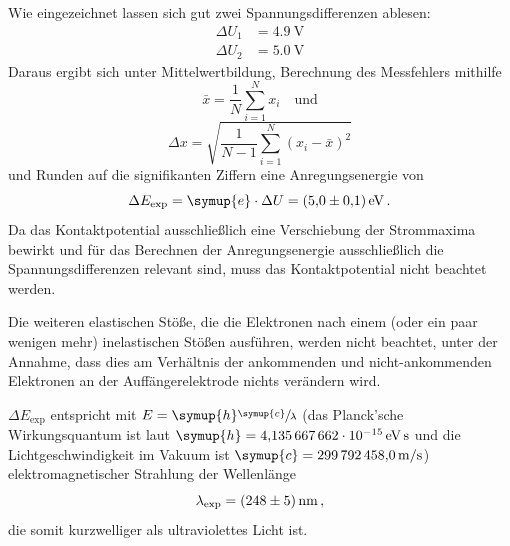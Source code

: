Wie eingezeichnet lassen sich gut zwei Spannungsdifferenzen ablesen:
\begin{align*}
    \Delta U_1&=\SI{4.9}{\volt} \\
    \Delta U_2&=\SI{5.0}{\volt}
\end{align*}
Daraus ergibt sich unter Mittelwertbildung, Berechnung des Messfehlers mithilfe 
\begin{equation*}
    \bar{x}=\frac{1}{N}\sum_{i=1}^N x_i \quad \text{und}
\end{equation*}
\begin{equation*}
    \Delta x = \sqrt{\frac{1}{N-1} \sum_{i=1}^N (x_i-\bar{x})^2}
\end{equation*}
und Runden auf die signifikanten Ziffern eine Anregungsenergie von 
\begin{equation}
    \Delta E_\text{exp}=\symup{e}\cdot \Delta U = \SI{5.0+-0.1}{\electronvolt}\,.
\end{equation}
Da das Kontaktpotential ausschließlich eine Verschiebung der Strommaxima bewirkt und für das Berechnen der 
Anregungsenergie ausschließlich die Spannungsdifferenzen relevant sind, muss das Kontaktpotential nicht beachtet werden. 

Die weiteren elastischen Stöße, die die Elektronen nach einem (oder ein paar wenigen mehr) inelastischen Stößen ausführen, 
werden nicht beachtet, unter der Annahme, dass dies am Verhältnis der ankommenden und nicht-ankommenden Elektronen an der 
Auffängerelektrode nichts verändern wird. 

$\Delta E_\text{exp}$ entspricht mit $E=\symup{h}\sfrac{\symup{c}}{\lambda}$ (das Planck'sche Wirkungsquantum ist laut \cite{scipy}
$\symup{h}=\SI{4.135667662e-15}{\electronvolt\second}$ und die Lichtgeschwindigkeit im Vakuum ist $\symup{c}=\SI{299792458.0}{\meter\per\second}$)
elektromagnetischer Strahlung der Wellenlänge 
\begin{equation}
    \lambda _\text{exp}=\SI{248+-5}{\nano\meter}\,,
\end{equation}
die somit kurzwelliger als ultraviolettes Licht ist.

